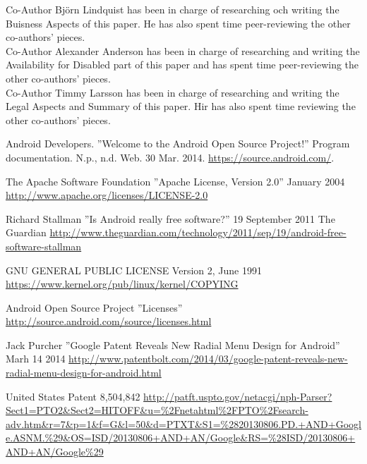 \documentclass[conference]{IEEEtran}
\begin{document}
{Co-Author Björn Lindquist has been in charge of researching och writing the Buisness Aspects of this paper. He has also spent time peer-reviewing the other co-authors' pieces.
\\
{Co-Author Alexander Anderson has been in charge of researching and writing the Availability for Disabled part of this paper and has spent time peer-reviewing the other co-authors' pieces.}
\\
{Co-Author Timmy Larsson has been in charge of researching and writing the Legal Aspects and Summary of this paper. Hir has also spent time reviewing the other co-authors' pieces.}

\begin{thebibliography}{1}



Android Developers. ''Welcome to the Android Open Source Project!'' Program documentation. N.p., n.d. Web. 30 Mar. 2014. \url{https://source.android.com/}.

The Apache Software Foundation ''Apache License, Version 2.0'' January 2004 \url{http://www.apache.org/licenses/LICENSE-2.0}

Richard Stallman ''Is Android really free software?'' 19 September 2011 The Guardian \url{http://www.theguardian.com/technology/2011/sep/19/android-free-software-stallman}

GNU GENERAL PUBLIC LICENSE Version 2, June 1991 \url{https://www.kernel.org/pub/linux/kernel/COPYING}

Android Open Source Project ''Licenses'' \url{http://source.android.com/source/licenses.html}

Jack Purcher ''Google Patent Reveals New Radial Menu Design for Android'' Marh 14 2014 \url{http://www.patentbolt.com/2014/03/google-patent-reveals-new-radial-menu-design-for-android.html}

United States Patent 8,504,842 \url{http://patft.uspto.gov/netacgi/nph-Parser?Sect1=PTO2&Sect2=HITOFF&u=%2Fnetahtml%2FPTO%2Fsearch-adv.htm&r=7&p=1&f=G&l=50&d=PTXT&S1=%2820130806.PD.+AND+Google.ASNM.%29&OS=ISD/20130806+AND+AN/Google&RS=%28ISD/20130806+AND+AN/Google%29}


\end{thebibliography}}
\end{document}
